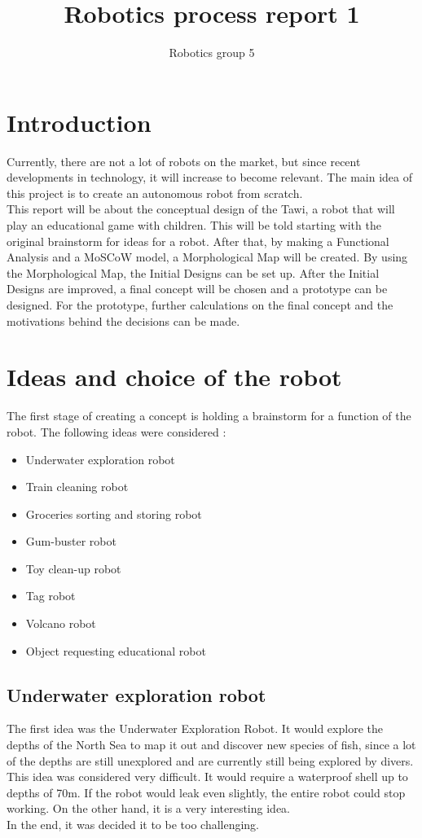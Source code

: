 \documentclass[11pt,twoside,a4paper]{report}
\begin{document}
\title{Robotics process report 1}
\author{Robotics group 5}

\tableofcontents

\chapter{Introduction}
Currently, there are not a lot of robots on the market, but since recent developments in technology, it will increase to become relevant. The main idea of this project is to create an autonomous robot from scratch. \\
This report will be about the conceptual design of the Tawi, a robot that will play an educational game with children. This will be told starting with the original brainstorm for ideas for a robot. After that, by making a Functional Analysis and a MoSCoW model, a Morphological Map will be created. By using the Morphological Map, the Initial Designs can be set up. After the Initial Designs are improved, a final concept will be chosen and a prototype can be designed. For the prototype, further calculations on the final concept and the motivations behind the decisions can be made.

\chapter{Ideas and choice of the robot}
The first stage of creating a concept is holding a brainstorm for a function of the robot. The following ideas were considered : 
\begin{itemize}
\item{Underwater exploration robot}
\item{Train cleaning robot}
\item{Groceries sorting and storing robot}
\item{Gum-buster robot}
\item{Toy clean-up robot}
\item{Tag robot}
\item{Volcano robot}
\item{Object requesting educational robot}
\end{itemize}

\section{Underwater exploration robot}
The first idea was the Underwater Exploration Robot. It would explore the depths of the North Sea to map it out and discover new species of fish, since a lot of the depths are still unexplored and are currently still being explored by divers. \\
This idea was considered very difficult. It would require a waterproof shell up to depths of 70m. If the robot would leak even slightly, the entire robot could stop working. On the other hand, it is a very interesting idea. \\
In the end, it was decided it to be too challenging.
\end{document}
